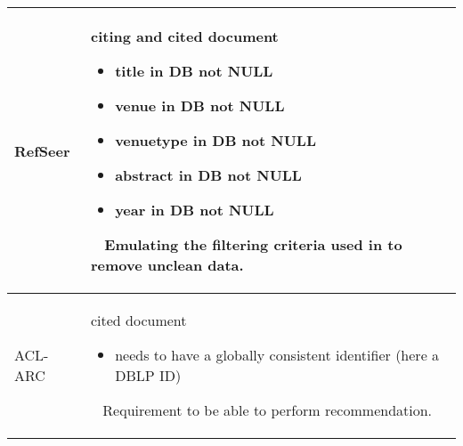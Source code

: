 \begin{table}[]
\begin{center}
\begin{tabular}{lp{11.5cm}}
    \midrule
    RefSeer & citing and cited document
            \begin{itemize}
                \item title in DB not NULL
                \item venue in DB not NULL
                \item venuetype in DB not NULL
                \item abstract in DB not NULL
                \item year in DB not NULL
            \end{itemize}
            \ 
            \newline
            Emulating the filtering criteria used in \cite{Ebesu2017} to remove unclean data.\\
    \midrule
    ACL-ARC & cited document
            \begin{itemize}
                \item needs to have a globally consistent identifier (here a DBLP ID)
            \end{itemize}
            \ 
            \newline
            Requirement to be able to perform recommendation.\\
    \bottomrule
    \end{tabular}
\end{center}
\end{table}
